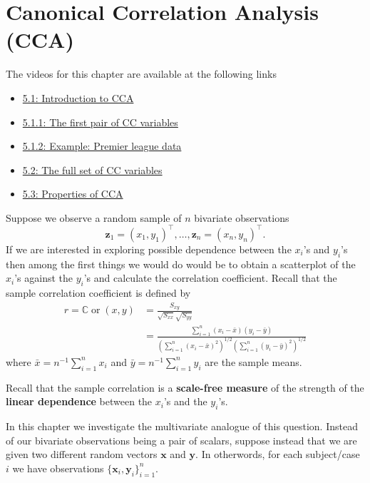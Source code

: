 \documentclass[
]{book}
\providecommand{\tightlist}{%
  \setlength{\itemsep}{0pt}\setlength{\parskip}{0pt}}
\theoremstyle{definition}
\theoremstyle{definition}
\theoremstyle{definition}
\theoremstyle{definition}
\theoremstyle{remark}
\begin{document}
\hypertarget{cca}{%
\chapter{Canonical Correlation Analysis (CCA)}\label{cca}}

The videos for this chapter are available at the following links

\begin{itemize}
\tightlist
\item
  \href{https://mediaspace.nottingham.ac.uk/media/CCA+Introduction/1_qhk7v35f}{5.1: Introduction to CCA}
\item
  \href{https://mediaspace.nottingham.ac.uk/media/CCAA+First+CC/1_yjm6kkxf}{5.1.1: The first pair of CC variables}
\item
  \href{https://mediaspace.nottingham.ac.uk/media/CCAA+Football+Example/1_r2v6924j}{5.1.2: Example: Premier league data}
\item
  \href{https://mediaspace.nottingham.ac.uk/media/CCAA+Full+Set/1_xmdoi9i6}{5.2: The full set of CC variables}
\item
  \href{https://mediaspace.nottingham.ac.uk/media/CCA\%3A\%20Properties/1_g24h27bj}{5.3: Properties of CCA}
\end{itemize}

Suppose we observe a random sample of \(n\) bivariate observations
\[
\mathbf z_1=(x_1,y_1)^\top , \ldots , \mathbf z_n=(x_n,y_n)^\top.
\]
If we are interested in exploring possible dependence between the \(x_i\)'s and \(y_i\)'s then among the first things we would do would be to obtain a scatterplot of the \(x_i\)'s against the \(y_i\)'s and calculate the correlation coefficient. Recall that the sample correlation coefficient is defined by
\begin{align}
r={\mathbb{C}\operatorname{or}}(x,y)&=\frac{S_{xy}}{\sqrt{S_{xx}}\sqrt{S_{yy}}}\\
&=\frac{\sum_{i=1}^n (x_i-\bar{x})(y_i-\bar{y})}{\left(\sum_{i=1}^n (x_i-\bar{x})^2  \right)^{1/2}  \left(\sum_{i=1}^n (y_i-\bar{y})^2 \right)^{1/2}}
\label{eq:scr}
\end{align}
where \(\bar{x}=n^{-1}\sum_{i=1}^n x_i\) and \(\bar{y}=n^{-1}\sum_{i=1}^n y_i\) are the sample means.

Recall that the sample correlation is a \textbf{scale-free measure} of the strength of the \textbf{linear dependence} between the \(x_i\)'s and the \(y_i\)'s.

In this chapter we investigate the multivariate analogue of this question. Instead of our bivariate observations being a pair of scalars, suppose instead that we are given two different random vectors \(\mathbf x\) and \(\mathbf y\). In otherwords, for each subject/case \(i\) we have observations
\(\{\mathbf x_i,\mathbf y_i\}_{i=1}^n.\)
\end{document}
